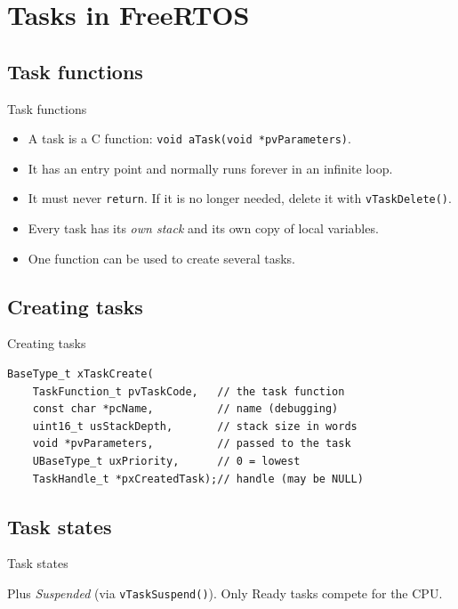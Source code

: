 \section{Tasks in FreeRTOS}
\label{sec:tasks}

\subsection{Task functions}
\begin{frame}{Task functions}
  \begin{itemize}
    \item A task is a C function: \texttt{void aTask(void *pvParameters)}.
    \item It has an entry point and normally runs forever in an infinite loop.
    \item It must never \texttt{return}. If it is no longer needed, delete it with \texttt{vTaskDelete()}.
    \item Every task has its \emph{own stack} and its own copy of local variables.
    \item One function can be used to create several tasks.
  \end{itemize}
\end{frame}

\subsection{Creating tasks}
\begin{frame}[fragile]{Creating tasks}
\begin{lstlisting}
BaseType_t xTaskCreate(
    TaskFunction_t pvTaskCode,   // the task function
    const char *pcName,          // name (debugging)
    uint16_t usStackDepth,       // stack size in words
    void *pvParameters,          // passed to the task
    UBaseType_t uxPriority,      // 0 = lowest
    TaskHandle_t *pxCreatedTask);// handle (may be NULL)
\end{lstlisting}
\end{frame}

\subsection{Task states}
\begin{frame}{Task states}
  \begin{center}
  \end{center}
  Plus \emph{Suspended} (via \texttt{vTaskSuspend()}). Only Ready tasks compete for the CPU.
\end{frame}

